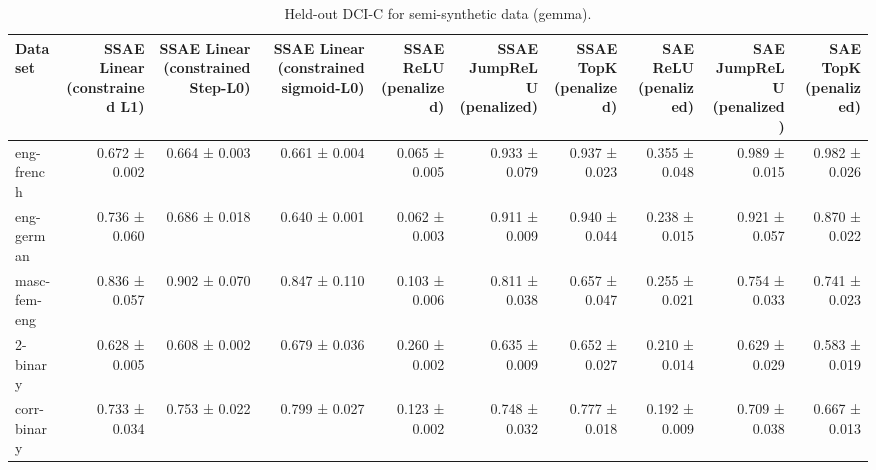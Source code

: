 \begin{table}[t]
\centering
\caption{Held-out DCI-C for semi-synthetic data (gemma).}
\label{tab:semisynthetic-gemma-dci-c}
\begin{tabular}{lrrrrrrrrr}
\toprule
Dataset & SSAE Linear (constrained L1) & SSAE Linear (constrained Step-L0) & SSAE Linear (constrained sigmoid-L0) & SSAE ReLU (penalized) & SSAE JumpReLU (penalized) & SSAE TopK (penalized) & SAE ReLU (penalized) & SAE JumpReLU (penalized) & SAE TopK (penalized) \\
\midrule
eng-french & 0.672 ± 0.002 & 0.664 ± 0.003 & 0.661 ± 0.004 & 0.065 ± 0.005 & 0.933 ± 0.079 & 0.937 ± 0.023 & 0.355 ± 0.048 & 0.989 ± 0.015 & 0.982 ± 0.026 \\
eng-german & 0.736 ± 0.060 & 0.686 ± 0.018 & 0.640 ± 0.001 & 0.062 ± 0.003 & 0.911 ± 0.009 & 0.940 ± 0.044 & 0.238 ± 0.015 & 0.921 ± 0.057 & 0.870 ± 0.022 \\
masc-fem-eng & 0.836 ± 0.057 & 0.902 ± 0.070 & 0.847 ± 0.110 & 0.103 ± 0.006 & 0.811 ± 0.038 & 0.657 ± 0.047 & 0.255 ± 0.021 & 0.754 ± 0.033 & 0.741 ± 0.023 \\
2-binary & 0.628 ± 0.005 & 0.608 ± 0.002 & 0.679 ± 0.036 & 0.260 ± 0.002 & 0.635 ± 0.009 & 0.652 ± 0.027 & 0.210 ± 0.014 & 0.629 ± 0.029 & 0.583 ± 0.019 \\
corr-binary & 0.733 ± 0.034 & 0.753 ± 0.022 & 0.799 ± 0.027 & 0.123 ± 0.002 & 0.748 ± 0.032 & 0.777 ± 0.018 & 0.192 ± 0.009 & 0.709 ± 0.038 & 0.667 ± 0.013 \\
\bottomrule
\end{tabular}
\end{table}
